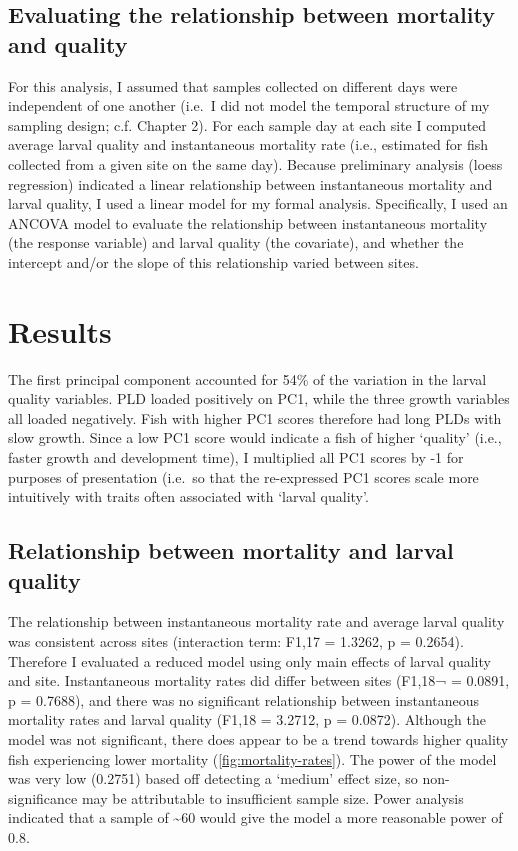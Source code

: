 \documentclass[]{book}
\begin{document}
\subsection{Evaluating the relationship between mortality and
quality}\label{evaluating-the-relationship-between-mortality-and-quality}

For this analysis, I assumed that samples collected on different days
were independent of one another (i.e.~I did not model the temporal
structure of my sampling design; c.f. Chapter 2). For each sample day at
each site I computed average larval quality and instantaneous mortality
rate (i.e., estimated for fish collected from a given site on the same
day). Because preliminary analysis (loess regression) indicated a linear
relationship between instantaneous mortality and larval quality, I used
a linear model for my formal analysis. Specifically, I used an ANCOVA
model to evaluate the relationship between instantaneous mortality (the
response variable) and larval quality (the covariate), and whether the
intercept and/or the slope of this relationship varied between sites.

\section{Results}\label{results-1}

The first principal component accounted for 54\% of the variation in the
larval quality variables. PLD loaded positively on PC1, while the three
growth variables all loaded negatively. Fish with higher PC1 scores
therefore had long PLDs with slow growth. Since a low PC1 score would
indicate a fish of higher `quality' (i.e., faster growth and development
time), I multiplied all PC1 scores by -1 for purposes of presentation
(i.e.~so that the re-expressed PC1 scores scale more intuitively with
traits often associated with `larval quality'.

\subsection{Relationship between mortality and larval
quality}\label{relationship-between-mortality-and-larval-quality}

The relationship between instantaneous mortality rate and average larval
quality was consistent across sites (interaction term: F1,17 = 1.3262, p
= 0.2654). Therefore I evaluated a reduced model using only main effects
of larval quality and site. Instantaneous mortality rates did differ
between sites (F1,18¬ = 0.0891, p = 0.7688), and there was no
significant relationship between instantaneous mortality rates and
larval quality (F1,18 = 3.2712, p = 0.0872). Although the model was not
significant, there does appear to be a trend towards higher quality fish
experiencing lower mortality (\ref{fig:mortality-rates}). The power of
the model was very low (0.2751) based off detecting a `medium' effect
size, so non-significance may be attributable to insufficient sample
size. Power analysis indicated that a sample of \textasciitilde{}60
would give the model a more reasonable power of 0.8.
\end{document}
